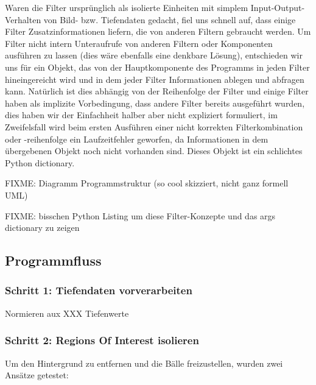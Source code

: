 \documentclass[12pt,a4paper,ngerman]{scrartcl}
\begin{document}
Waren die Filter ursprünglich als isolierte Einheiten mit simplem 
Input-Output-Verhalten von Bild- bzw. Tiefendaten gedacht, fiel uns schnell auf,
dass einige Filter Zusatzinformationen liefern, die von anderen Filtern gebraucht 
werden. Um Filter nicht intern Unteraufrufe von anderen Filtern oder Komponenten
ausführen zu lassen (dies wäre ebenfalls eine denkbare Lösung), entschieden wir uns
für ein Objekt, das von der Hauptkomponente des Programms in jeden Filter 
hineingereicht wird und in dem jeder Filter Informationen ablegen und abfragen kann.
Natürlich ist dies abhängig von der Reihenfolge der Filter und einige Filter haben 
als implizite Vorbedingung, dass andere Filter bereits ausgeführt wurden, dies haben
wir der Einfachheit halber aber nicht expliziert formuliert, im Zweifelsfall wird 
beim ersten Ausführen einer nicht korrekten Filterkombination oder -reihenfolge ein
Laufzeitfehler geworfen, da Informationen in dem übergebenen Objekt noch nicht 
vorhanden sind. Dieses Objekt ist ein schlichtes Python dictionary.


{\color{red} FIXME: Diagramm Programmstruktur (so cool skizziert, nicht ganz formell UML)}

{\color{red} FIXME: bisschen Python Listing um diese Filter-Konzepte und das args dictionary zu zeigen}


\subsection{Programmfluss}

\subsubsection{Schritt 1: Tiefendaten vorverarbeiten}

Normieren aux XXX Tiefenwerte

\subsubsection{Schritt 2: Regions Of Interest isolieren}

Um den Hintergrund zu entfernen und die Bälle freizustellen, wurden zwei Ansätze getestet:
\end{document}
